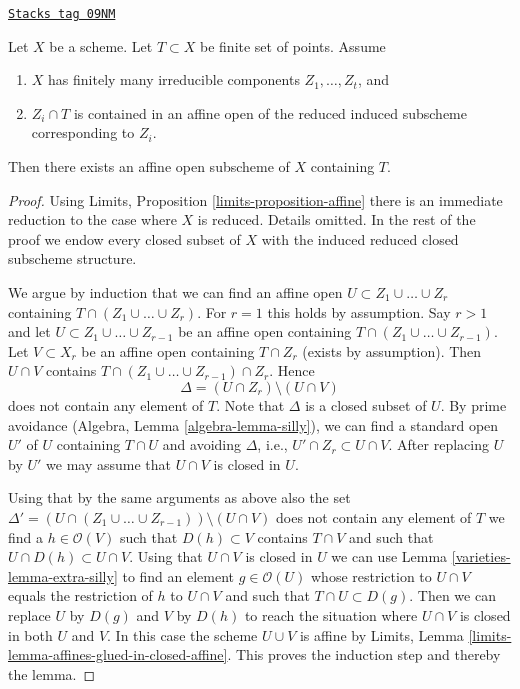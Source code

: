 \begin{lemma}
\label{varieties-lemma-finite-set-codim-1-points-in-affine-per-component}
\href{https://stacks.math.columbia.edu/tag/09NM}{\texttt{Stacks tag 09NM}}

Let $X$ be a scheme. Let $T \subset X$ be finite set of points. Assume
\begin{enumerate}
\item $X$ has finitely many irreducible components $Z_1, \ldots, Z_t$, and
\item $Z_i \cap T$ is contained in an affine open of the reduced
induced subscheme corresponding to $Z_i$.
\end{enumerate}
Then there exists an affine open subscheme of $X$ containing $T$.
\end{lemma}

\begin{proof}

Using Limits, Proposition \ref{limits-proposition-affine}
there is an immediate reduction to the case where $X$
is reduced. Details omitted. In the rest of the proof we
endow every closed subset of $X$ with the induced reduced closed
subscheme structure.

\medskip\noindent
We argue by induction that we can find an affine open
$U \subset Z_1 \cup \ldots \cup Z_r$ containing
$T \cap (Z_1 \cup \ldots \cup Z_r)$. For $r = 1$ this holds by assumption.
Say $r > 1$ and let $U \subset Z_1 \cup \ldots \cup Z_{r -  1}$
be an affine open containing $T \cap (Z_1 \cup \ldots \cup Z_{r - 1})$.
Let $V \subset X_r$ be an affine open containing $T \cap Z_r$ (exists by
assumption). Then $U \cap V$ contains
$T \cap ( Z_1 \cup \ldots \cup Z_{r - 1} ) \cap Z_r$.
Hence
$$
\Delta = (U \cap Z_r) \setminus (U \cap V)
$$
does not contain any element of $T$. Note that $\Delta$ is a closed
subset of $U$. By prime avoidance (Algebra, Lemma \ref{algebra-lemma-silly}),
we can find a standard open $U'$ of $U$ containing $T \cap U$ and avoiding
$\Delta$, i.e., $U' \cap Z_r \subset U \cap V$.
After replacing $U$ by $U'$ we may assume that $U \cap V$ is
closed in $U$.

\medskip\noindent
Using that by the same arguments as above also the set
$\Delta' = (U \cap (Z_1 \cup \ldots \cup Z_{r - 1})) \setminus (U \cap V)$
does not contain any element of $T$ we find a $h \in \mathcal{O}(V)$
such that $D(h) \subset V$ contains $T \cap V$ and such that
$U \cap D(h) \subset U \cap V$. Using that $U \cap V$ is closed in $U$
we can use Lemma \ref{varieties-lemma-extra-silly}
to find an element $g \in \mathcal{O}(U)$ whose restriction to $U \cap V$
equals the restriction of $h$ to $U \cap V$ and such that
$T \cap U \subset D(g)$. Then we can replace $U$ by $D(g)$
and $V$ by $D(h)$ to reach the situation where $U \cap V$ is
closed in both $U$ and $V$. In this case the scheme $U \cup V$ is
affine by Limits, Lemma \ref{limits-lemma-affines-glued-in-closed-affine}.
This proves the induction step and thereby the lemma.
\end{proof}

